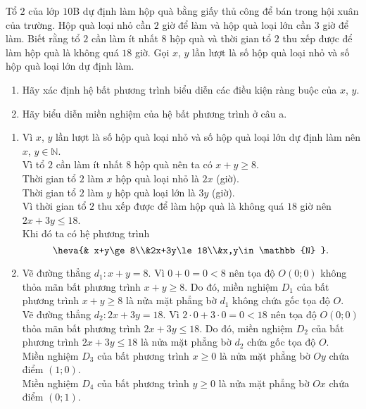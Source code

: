 \begin{bt}%
	Tổ $2$ của lớp $10$B dự định làm hộp quà bằng giấy thủ công để bán trong hội xuân của trường. Hộp quà loại nhỏ cần $2$ giờ để làm và hộp quà loại lớn cần $3$ giờ để làm. Biết rằng tổ $2$ cần làm ít nhất $8$ hộp quà và thời gian tổ $2$ thu xếp được để làm hộp quà là không quá $18$ giờ. Gọi $x$, $y$ lần lượt là số hộp quà loại nhỏ và số hộp quà loại lớn dự định làm.
	\begin{enumerate}
		\item Hãy xác định hệ bất phương trình biểu diễn các điều kiện ràng buộc của $x$, $y$.
		\item Hãy biểu diễn miền nghiệm của hệ bất phương trình ở câu a.
	\end{enumerate}
	\loigiai
	{
		\begin{enumerate}
			\item Vì $x$, $y$ lần lượt là số hộp quà loại nhỏ và số hộp quà loại lớn dự định làm nên $x$, $y\in\mathbb{N}$.\\
			Vì tổ $2$ cần làm ít nhất $8$ hộp quà nên ta có $x+y\ge 8$.\\
			Thời gian tổ $2$ làm $x$ hộp quà loại nhỏ là $2x$ (giờ).\\
			Thời gian tổ $2$ làm $y$ hộp quà loại lớn là $3y$ (giờ).\\
			Vì thời gian tổ $2$ thu xếp được để làm hộp quà là không quá $18$ giờ nên $2x+3y\le 18$.\\
			Khi đó ta có hệ phương trình $$\heva{& x+y\ge 8\\&2x+3y\le 18\\&x,y\in\mathbb{N} }.$$
			\item Vẽ đường thẳng $d_1\colon x+y=8$. Vì $0+0=0<8$ nên tọa độ $O(0;0)$ không thỏa mãn bất phương trình $x+y\ge 8$. Do đó, miền nghiệm $D_1$ của bất phương trình $x+y\ge 8$ là nửa mặt phẳng bờ $d_1$ không chứa gốc tọa độ $O$.\\
			Vẽ đường thẳng $d_2\colon 2x+3y=18$. Vì $2\cdot 0+3\cdot 0=0<18$ nên tọa độ $O(0;0)$ thỏa mãn bất phương trình $2x+3y\le 18$. Do đó, miền nghiệm $D_2$ của bất phương trình $2x+3y\le 18$ là nửa mặt phẳng bờ $d_2$ chứa gốc tọa độ $O$.\\
			Miền nghiệm $D_3$ của bất phương trình $x\ge 0$ là nửa mặt phẳng bờ $Oy$ chứa điểm $(1;0)$.\\
			Miền nghiệm $D_4$ của bất phương trình $y\ge 0$ là nửa mặt phẳng bờ $Ox$ chứa điểm $(0;1)$.\\

\end{enumerate}}
\end{bt}
